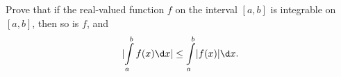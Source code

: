 \begin{problem}
  Prove that if the real-valued function $f$ on the interval $[a, b]$
  is integrable on $[a, b]$, then so is $f$, and
  \[
    \abs{\int\limits_a^b f(x) \d x} \leq \int\limits_a^b \abs{f(x)} \d x.
  \]
\end{problem}

\begin{answer}

\end{answer}
